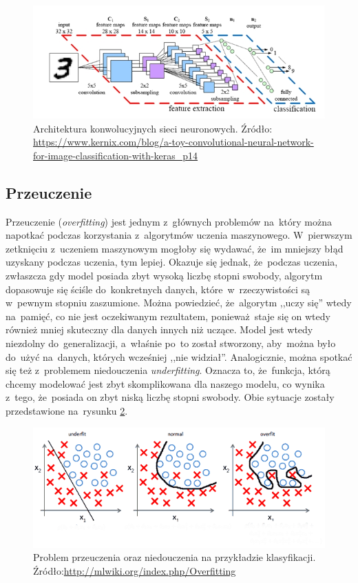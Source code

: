 \begin{figure}[ht!]
\centering
\includegraphics[scale=0.75]{res/cnn3.jpg}
\caption[Caption for LOF]{Architektura konwolucyjnych sieci neuronowych. Źródło: \url{ https://www.kernix.com/blog/a-toy-convolutional-neural-network-for-image-classification-with-keras_p14}\label{cnn3}} 
\end{figure}


\subsection{Przeuczenie}\label{overfitting_section}
Przeuczenie (\textit{overfitting}) jest jednym z~głównych problemów na~który można napotkać podczas korzystania z~algorytmów uczenia maszynowego. W~pierwszym zetknięciu z~uczeniem maszynowym mogłoby się wydawać, że~im mniejszy błąd uzyskany podczas uczenia, tym lepiej. Okazuje się jednak, że~podczas uczenia, zwłaszcza gdy model posiada zbyt wysoką liczbę stopni swobody, algorytm dopasowuje się ściśle do~konkretnych danych, które~w~rzeczywistości są w~pewnym stopniu zaszumione. Można powiedzieć, że~algorytm ,,uczy się'' wtedy na~pamięć, co nie jest oczekiwanym rezultatem, ponieważ~staje się on wtedy również mniej skuteczny dla danych innych niż uczące.  Model jest wtedy niezdolny do~generalizacji, a~właśnie po~to został stworzony, aby~można było do~użyć na~danych, których wcześniej ,,nie widział''. Analogicznie, można spotkać się też z~problemem niedouczenia \textit{underfitting}. Oznacza to, że~funkcja, którą chcemy modelować jest zbyt skomplikowana dla naszego modelu, co wynika z~tego, że~posiada on zbyt niską liczbę stopni swobody. Obie sytuacje zostały przedstawione na~rysunku \ref{overfitting}.

\begin{figure}[ht!]
\centering
\includegraphics[scale=0.8]{res/overfitting.png}
\caption[Caption for LOF]{Problem przeuczenia oraz niedouczenia na przykładzie klasyfikacji. Źródło:\url{http://mlwiki.org/index.php/Overfitting}\label{overfitting}} 
\end{figure}

